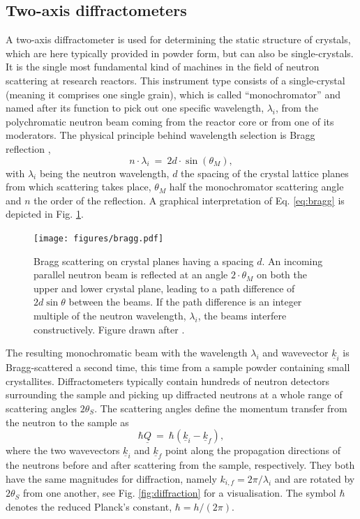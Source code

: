\subsection{Two-axis diffractometers}

A two-axis diffractometer is used for determining the static structure of crystals, which are here typically provided
in powder form, but can also be single-crystals. It is the single most fundamental kind of machines in the field of
neutron scattering at research reactors. This instrument type consists of a single-crystal (meaning it comprises one
single grain), which is called ``monochromator'' and named after its function to pick out one specific wavelength,
$\lambda_i$, from the polychromatic neutron beam coming from the reactor core or from one of its moderators.
The physical principle behind wavelength selection is Bragg reflection \cite[p. 68]{Gross2012} \cite[p. 13]{Shirane2002},
\begin{equation}
	\label{eq:bragg}
	n \cdot \lambda_i \ =\  2 d \cdot \sin\left( \theta_M \right),
\end{equation}
with $\lambda_i$ being the neutron wavelength, $d$ the spacing of the crystal lattice planes from which scattering
takes place, $\theta_M$ half the monochromator scattering angle and $n$ the order of the reflection. A graphical
interpretation of Eq. \ref{eq:bragg} is depicted in Fig. \ref{fig:braggscattering}.

\begin{figure}[htb]
	\centering
	\texttt{[image: figures/bragg.pdf]}
	\caption[Bragg scattering.]{
		Bragg scattering on crystal planes having a spacing $d$. An incoming parallel neutron beam is reflected at an
		angle $2 \cdot \theta_M$ on both the upper and lower crystal plane, leading to a path difference of
		$2d \sin\theta$ between the beams. If the path difference is an integer multiple of the neutron wavelength,
		$\lambda_i$, the beams interfere constructively. Figure drawn after \cite[p. 68, Fig. 2.7]{Gross2012}. }
	\label{fig:braggscattering}
\end{figure}

The resulting monochromatic beam with the wavelength $\lambda_i$ and wavevector $\underline{k}_i$ is Bragg-scattered
a second time, this time from a sample powder containing small crystallites. Diffractometers typically contain hundreds
of neutron detectors surrounding the sample and picking up diffracted neutrons at a whole range of scattering angles
$2 \theta_S$. The scattering angles define the momentum transfer from the neutron to the sample as \cite[p. 11]{Shirane2002}
\begin{equation}
	\label{eq:Q}
	\hbar \underline{Q} \ =\  \hbar \left( \underline{k}_i - \underline{k}_f \right),
\end{equation}
where the two wavevectors $\underline{k}_i$ and $\underline{k}_f$ point along the propagation directions of the neutrons
before and after scattering from the sample, respectively. They both have the same magnitudes for diffraction, namely
$k_{i,f} = 2\pi / \lambda_i$ and are rotated by $2\theta_S$ from one another, see Fig. \ref{fig:diffraction} for a visualisation.
The symbol $\hbar$ denotes the reduced Planck's constant, $\hbar = h / \left( 2\pi \right)$.


